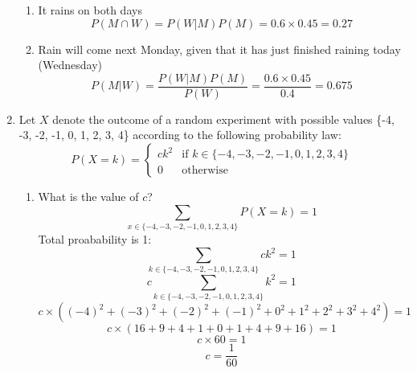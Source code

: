 \documentclass[a3paper,12pt]{extarticle} %
\begin{document}
\begin{enumerate}
    \begin{enumerate}
        \item It rains on both days
        \[
            P(M \cap W) = P(W | M)P(M) = 0.6 \times 0.45 = 0.27
        \]
        \item Rain will come next Monday, given that it has just finished raining today (Wednesday)
        \[
            P(M | W) = \frac{P(W | M)P(M)}{P(W)} = \frac{0.6 \times 0.45}{0.4} = 0.675
        \]
    \end{enumerate}
    \item Let \(X\) denote the outcome of a random experiment with possible values \{-4, -3, -2, -1, 0, 1, 2, 3, 4\} according to the following probability law:
    \[
        P(X = k) = 
    \begin{cases}
        ck^2 & \text{if } k \in \{-4, -3, -2, -1, 0, 1, 2, 3, 4\} \\
        0 & \text{otherwise}
    \end{cases}
    \]
    \begin{enumerate}
        \item What is the value of \(c\)?
        \[
            \sum_{x \in \{-4, -3, -2, -1, 0, 1, 2, 3, 4\}} P(X = k) = 1
        \]
        Total proabability is 1:
        \[
            \sum_{k \in \{-4, -3, -2, -1, 0, 1, 2, 3, 4\}} ck^2 = 1
        \]
        \[
            c \sum_{k \in \{-4, -3, -2, -1, 0, 1, 2, 3, 4\}} k^2 = 1
        \]
        \[
            c \times( (-4)^2 + (-3)^2 + (-2)^2 + (-1)^2 + 0^2 + 1^2 + 2^2 + 3^2 + 4^2) = 1
        \]
        \[
            c \times( 16 + 9 + 4 + 1 + 0 + 1 + 4 + 9 + 16) = 1
        \]
        \[
            c \times 60 = 1
        \]
        \[
            c = \frac{1}{60}
        \]
        

\end{enumerate}
\end{enumerate}
\end{document}
